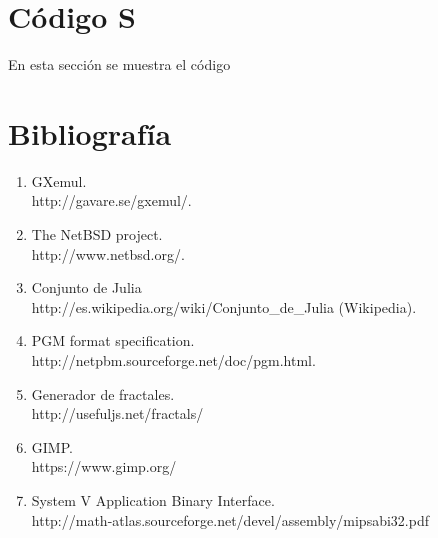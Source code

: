 \documentclass[a4paper,10pt]{article}
\begin{document}
\section{Código S}

En esta sección se muestra el código 



\section{Bibliografía}
\begin{enumerate}
\item GXemul. \\ http://gavare.se/gxemul/.
\item The NetBSD project. \\
	http://www.netbsd.org/.
\item Conjunto de Julia \\ 
	http://es.wikipedia.org/wiki/Conjunto\_de\_Julia (Wikipedia).
\item PGM format specification.\\
	http://netpbm.sourceforge.net/doc/pgm.html.
\item Generador de fractales. \\
	http://usefuljs.net/fractals/
\item GIMP. \\
	https://www.gimp.org/
\item System V Application Binary Interface. \\
	http://math-atlas.sourceforge.net/devel/assembly/mipsabi32.pdf
\end{enumerate}
\end{document}
